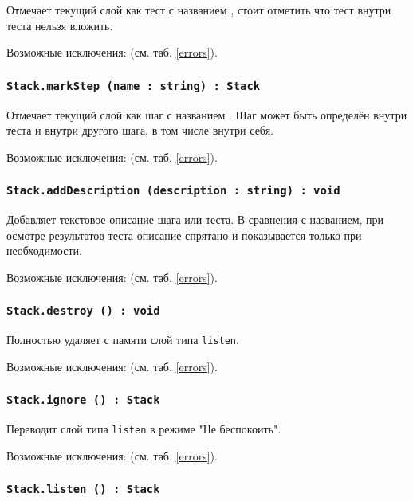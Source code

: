 Отмечает текущий слой как тест с названием , стоит отметить что тест внутри теста нельзя вложить.

Возможные исключения:  (см. таб. \ref{errors}).

\subsubsection{\lstinline|Stack.markStep (name : string) : Stack|}

Отмечает текущий слой как шаг с названием . Шаг может быть определён внутри теста и внутри другого шага, в том числе внутри себя.

Возможные исключения:  (см. таб. \ref{errors}).

\subsubsection{\lstinline|Stack.addDescription (description : string) : void|}

Добавляет текстовое описание шага или теста. В сравнения с названием, при осмотре результатов теста описание спрятано и показывается только при необходимости.

Возможные исключения:  (см. таб. \ref{errors}).

\subsubsection{\lstinline|Stack.destroy () : void|}

Полностью удаляет с памяти слой типа \lstinline|listen|.

Возможные исключения:  (см. таб. \ref{errors}).

\subsubsection{\lstinline|Stack.ignore () : Stack|}

Переводит слой типа \lstinline|listen| в режиме "Не беспокоить".

Возможные исключения:  (см. таб. \ref{errors}).

\subsubsection{\lstinline|Stack.listen () : Stack|}

